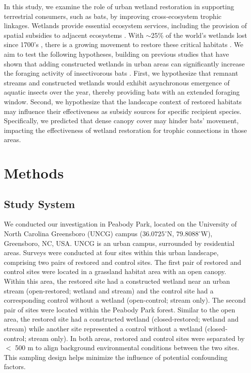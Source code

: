 \documentclass[11pt, class=article, crop=false]{standalone}
\begin{document}
In this study, we examine the role of urban wetland restoration in supporting terrestrial consumers, such as bats, by improving cross-ecosystem trophic linkages.
Wetlands provide essential ecosystem services, including the provision of spatial subsidies to adjacent ecosystems \citep{schindler_subsidies_2017, reis_global_2017}.
With $\sim$25\% of the world’s wetlands lost since 1700's \citep{fluet-chouinard_extensive_2023}, there is a growing movement to restore these critical habitats \citep{reis_global_2017}.
We aim to test the following hypotheses, building on previous studies that have shown that adding constructed wetlands in urban areas can significantly increase the foraging activity of insectivorous bats \citep{parker_rapid_2019, li_four_2021}.
First, we hypothesize that remnant streams and constructed wetlands would exhibit asynchronous emergence of aquatic insects over the year, thereby providing bats with an extended foraging window. 
Second, we hypothesize that the landscape context of restored habitats may influence their effectiveness as subsidy sources for specific recipient species.
Specifically, we predicted that dense canopy cover may hinder bats' movement, impacting the effectiveness of wetland restoration for trophic connections in those areas.

\newpage

\section{Methods}

\subsection{Study System}

We conducted our investigation in Peabody Park, located on the University of North Carolina Greensboro (UNCG) campus ($36.0725^\circ$N, $79.8088^\circ$W), Greensboro, NC, USA.
UNCG is an urban campus, surrounded by residential areas.
Surveys were conducted at four sites within this urban landscape, comprising two pairs of restored and control sites.
The first pair of restored and control sites were located in a grassland habitat area with an open canopy.
Within this area, the restored site had a constructed wetland near an urban stream (open-restored; wetland and stream) and the control site had a corresponding control without a wetland (open-control; stream only).
The second pair of sites were located within the Peabody Park forest.
Similar to the open area, the restored site had a constructed wetland (closed-restored; wetland and stream) while another site represented a control without a wetland (closed-control; stream only).
In both areas, restored and control sites were separated by $<$ 500 m to align background environmental conditions between the two sites.
This sampling design helps minimize the influence of potential confounding factors.
\end{document}
